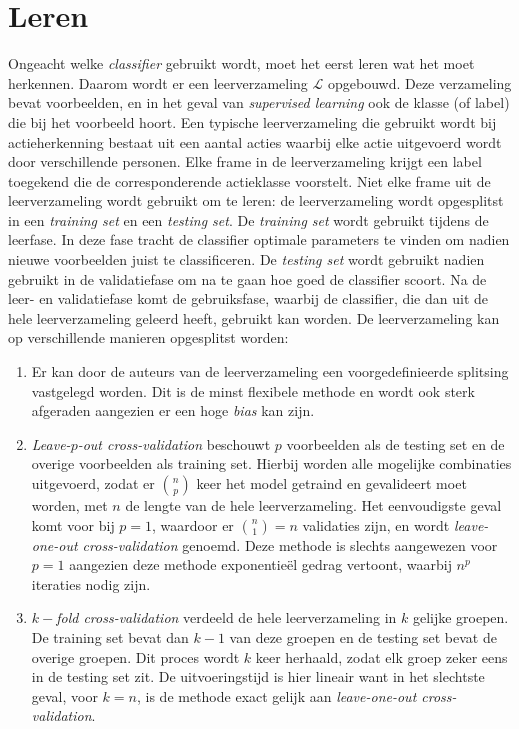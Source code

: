 \section{Leren}
Ongeacht welke \textit{classifier} gebruikt wordt, moet het eerst leren wat het moet herkennen. Daarom wordt er een leerverzameling $\mathcal{L}$ opgebouwd. Deze verzameling bevat voorbeelden, en in het geval van \textit{supervised learning} ook de klasse (of label) die bij het voorbeeld hoort. Een typische leerverzameling die gebruikt wordt bij actieherkenning bestaat uit een aantal acties waarbij elke actie uitgevoerd wordt door verschillende personen. Elke frame in de leerverzameling krijgt een label toegekend die de corresponderende actieklasse voorstelt. Niet elke frame uit de leerverzameling wordt gebruikt om te leren: de leerverzameling wordt opgesplitst in een \textit{training set} en een \textit{testing set}. De \textit{training set} wordt gebruikt tijdens de leerfase. In deze fase tracht de classifier optimale parameters te vinden om nadien nieuwe voorbeelden juist te classificeren. De \textit{testing set} wordt gebruikt nadien gebruikt in de validatiefase om na te gaan hoe goed de classifier scoort. Na de leer- en validatiefase komt de gebruiksfase, waarbij de classifier, die dan uit de hele leerverzameling geleerd heeft, gebruikt kan worden. De leerverzameling kan op verschillende manieren opgesplitst worden:
\begin{enumerate}
	\item Er kan door de auteurs van de leerverzameling een voorgedefinieerde splitsing vastgelegd worden. Dit is de minst flexibele methode en wordt ook sterk afgeraden aangezien er een hoge \textit{bias} kan zijn. 
	\item \textit{Leave-$p$-out cross-validation} beschouwt $p$ voorbeelden als de testing set en de overige voorbeelden als training set. Hierbij worden alle mogelijke combinaties uitgevoerd, zodat er $\binom{n}{p}$ keer het model getraind en gevalideert moet worden, met $n$ de lengte van de hele leerverzameling. Het eenvoudigste geval komt voor bij $p = 1$, waardoor er $\binom{n}{1} = n$ validaties zijn, en wordt \textit{leave-one-out cross-validation} genoemd. Deze methode is slechts aangewezen voor $p = 1$ aangezien deze methode  exponentieël gedrag vertoont, waarbij $n^p$ iteraties nodig zijn.
	
	\item \textit{$k-$fold cross-validation} verdeeld de hele leerverzameling in $k$ gelijke groepen. De training set bevat dan $k - 1$ van deze groepen en de testing set bevat de overige groepen. Dit proces wordt $k$ keer herhaald, zodat elk groep zeker eens in de testing set zit. De uitvoeringstijd is hier lineair want in het slechtste geval, voor $k = n$, is de methode exact gelijk aan  \textit{leave-one-out cross-validation}.
\end{enumerate} 

